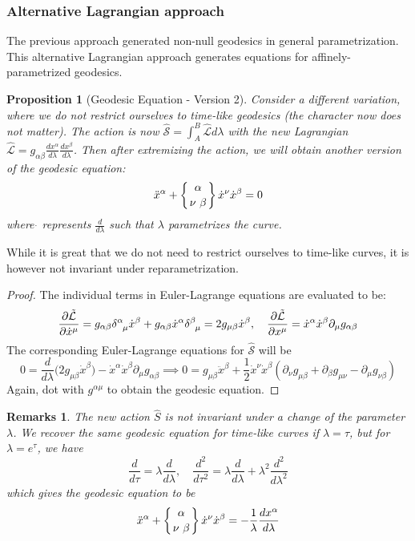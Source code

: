 \documentclass[a4paper]{article}
\newtheorem{remarks}{Remarks}[section]
\theoremstyle{new}
\newtheorem{prop}{Proposition}[section]
\begin{document}
\subsubsection*{Alternative Lagrangian approach}
The previous approach generated non-null geodesics in general parametrization. This alternative Lagrangian approach generates equations for affinely-parametrized geodesics.
\begin{prop}[Geodesic Equation - Version 2]
Consider a different variation, where we do not restrict ourselves to time-like geodesics (the character now does not matter). The action is now $\hat{\mathcal{S}}=\int_A^B\hat{\mathcal{L}}d\lambda$ with the new Lagrangian $\hat{\mathcal{L}}=g_{\alpha\beta}\frac{dx^\alpha}{d\lambda}\frac{dx^\beta}{d\lambda}$. Then after extremizing the action, we will obtain another version of the geodesic equation:
\begin{equation}
    \ddot{x}^\alpha+ \left \{ {\alpha \atop
\nu\ \beta}\right\} \dot{x}^\nu\dot{x}^\beta=0\label{geodesic2}
\end{equation}
where $\dot{ }$ represents $\frac{d}{d\lambda}$ such that $\lambda$ parametrizes the curve. 
\end{prop}
While it is great that we do not need to restrict ourselves to time-like curves, it is however not invariant under reparametrization. 
\begin{proof}
The individual terms in Euler-Lagrange equations are evaluated to be:
$$\frac{\partial\tilde{\mathcal{L}}}{\partial\dot{x}^\mu}=g_{\alpha\beta}\tensor*{\delta}{*_{}^{\alpha}_{\mu}}\dot{x}^\beta+g_{\alpha\beta}\dot{x}^\alpha\tensor*{\delta}{*_{}^{\beta}_{\mu}}=2g_{\mu\beta}\dot{x}^\beta,\quad\frac{\partial\tilde{\mathcal{L}}}{\partial x^\mu}=\dot{x}^\alpha\dot{x}^\beta\partial_\mu g_{\alpha\beta}$$
The corresponding Euler-Lagrange equations for $\hat{\mathcal{S}}$ will be 
$$0=\frac{d}{d\lambda}\bigg(2g_{\mu\beta}\dot{x}^\beta\bigg)-\dot{x}^\alpha\dot{x}^\beta\partial_\mu g_{\alpha\beta}\implies 0=g_{\mu\beta}\ddot{x}^\beta+\frac{1}{2}\dot{x}^\nu\dot{x}^\beta(\partial_\nu g_{\mu\beta}+\partial_\beta g_{\mu\nu}-\partial_\mu g_{\nu\beta})$$
Again, dot with $g^{\alpha\mu}$ to obtain the geodesic equation.
\end{proof}
\begin{remarks}
The new action $\hat{S}$ is not invariant under a change of the parameter $\lambda$. We recover the same geodesic equation for time-like curves if $\lambda=\tau$, but for $\lambda=e^\tau$, we have
$$\frac{d}{d\tau}=\lambda\frac{d}{d\lambda},\quad\frac{d^2}{d\tau^2}=\lambda\frac{d}{d\lambda}+\lambda^2\frac{d^2}{d\lambda^2}$$
which gives the geodesic equation to be 
$$\ddot{x}^\alpha+\left \{ {\alpha \atop
\nu\ \beta}\right\}\dot{x}^\nu\dot{x}^\beta =-\frac{1}{\lambda}\frac{dx^\alpha}{d\lambda}$$
\end{remarks}
\end{document}
